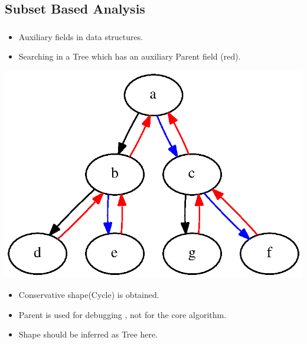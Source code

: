 \documentclass[mathserif,10pt]{beamer}
\begin{document}
\subsection{Subset Based Analysis}
\frame
{
  \frametitle{\subsecname}
    
  \begin{itemize}
   \item Auxiliary fields in data structures.
   \item Searching in a Tree which has an auxiliary Parent field (red).
  \end{itemize}
    \centering \includegraphics[scale=0.4]{tree.eps}   
   \begin{itemize}
     \pause
    \item Conservative shape(Cycle) is obtained.   
    \item Parent is used for debugging , not for the core algorithm.
    \item Shape should be inferred as Tree here.
   \end{itemize}
}
\end{document}
